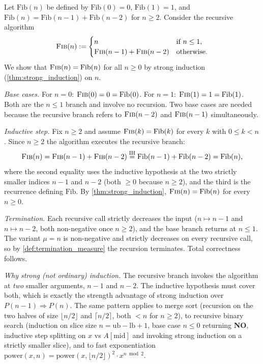 \begin{example}
\label{ex:recursive_correctness}
Let $\mathrm{Fib}(n)$ be defined by $\mathrm{Fib}(0) = 0$, $\mathrm{Fib}(1) = 1$, and $\mathrm{Fib}(n) = \mathrm{Fib}(n-1) + \mathrm{Fib}(n-2)$ for $n \ge 2$. Consider the recursive algorithm
\[
  \textsc{Fib}(n) := \begin{cases} n & \text{if } n \le 1, \\ \textsc{Fib}(n-1) + \textsc{Fib}(n-2) & \text{otherwise.} \end{cases}
\]
We show that $\textsc{Fib}(n) = \mathrm{Fib}(n)$ for all $n \ge 0$ by strong induction (\cref{thm:strong_induction}) on $n$.

\medskip
\noindent\textit{Base cases.} For $n = 0$: $\textsc{Fib}(0) = 0 = \mathrm{Fib}(0)$. For $n = 1$: $\textsc{Fib}(1) = 1 = \mathrm{Fib}(1)$. Both are the $n \le 1$ branch and involve no recursion. Two base cases are needed because the recursive branch refers to $\textsc{Fib}(n-2)$ and $\textsc{Fib}(n-1)$ simultaneously.

\medskip
\noindent\textit{Inductive step.} Fix $n \ge 2$ and assume $\textsc{Fib}(k) = \mathrm{Fib}(k)$ for every $k$ with $0 \le k < n$. Since $n \ge 2$ the algorithm executes the recursive branch:
\[
  \textsc{Fib}(n) = \textsc{Fib}(n-1) + \textsc{Fib}(n-2)
  \stackrel{\text{IH}}{=} \mathrm{Fib}(n-1) + \mathrm{Fib}(n-2)
  = \mathrm{Fib}(n),
\]
where the second equality uses the inductive hypothesis at the two strictly smaller indices $n-1$ and $n-2$ (both $\ge 0$ because $n \ge 2$), and the third is the recurrence defining $\mathrm{Fib}$. By \cref{thm:strong_induction}, $\textsc{Fib}(n) = \mathrm{Fib}(n)$ for every $n \ge 0$.

\medskip
\noindent\textit{Termination.} Each recursive call strictly decreases the input ($n \mapsto n-1$ and $n \mapsto n-2$, both non-negative once $n \ge 2$), and the base branch returns at $n \le 1$. The variant $\mu = n$ is non-negative and strictly decreases on every recursive call, so by \cref{def:termination_measure} the recursion terminates. Total correctness follows.

\medskip
\noindent\textit{Why strong (not ordinary) induction.} The recursive branch invokes the algorithm at \emph{two} smaller arguments, $n-1$ and $n-2$. The inductive hypothesis must cover both, which is exactly the strength advantage of strong induction over $P(n-1) \Rightarrow P(n)$. The same pattern applies to merge sort (recursion on the two halves of size $\lfloor n/2 \rfloor$ and $\lceil n/2 \rceil$, both $< n$ for $n \ge 2$), to recursive binary search (induction on slice size $n = \mathrm{ub} - \mathrm{lb} + 1$, base case $n \le 0$ returning \textbf{NO}, inductive step splitting on $x$ vs $A[\mathrm{mid}]$ and invoking strong induction on a strictly smaller slice), and to fast exponentiation $\mathrm{power}(x, n) = \mathrm{power}(x, \lfloor n/2 \rfloor)^2 \cdot x^{n \bmod 2}$.
\end{example}


